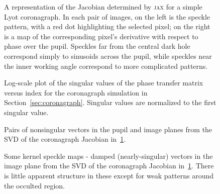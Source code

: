 \documentclass[modern]{aastex63}
\begin{document}
\begin{figure}
\caption{A representation of the Jacobian determined by \textsc{jax} for a simple Lyot coronagraph. In each pair of images, on the left is the speckle pattern, with a red dot highlighting the selected pixel; on the right is a map of the corresponding pixel's derivative with respect to phase over the pupil. Speckles far from the central dark hole correspond simply to sinusoids across the pupil, while speckles near the inner working angle correspond to more complicated patterns. \label{speckle_jacobian}}
\end{figure}


\begin{figure}
     \caption{Log-scale plot of the singular values of the phase transfer matrix versus index for the coronagraph simulation in Section~\ref{sec:coronagraph}. Singular values are normalized to the first singular value.}
    \label{fig:svd_coronagraph}
\end{figure}

\begin{figure}
\caption{Pairs of nonsingular vectors in the pupil and image planes from the SVD of the coronagraph Jacobian in~\ref{speckle_jacobian}.
\label{nonsingular_corona}} 
\end{figure}

\begin{figure}
\caption{Some kernel speckle maps - damped (nearly-singular) vectors in the image plane from the SVD of the coronagraph Jacobian in~\ref{speckle_jacobian}. There is little apparent structure in these except for weak patterns around the occulted region.
\label{kernel_corona}}
\end{figure}

\end{document}

